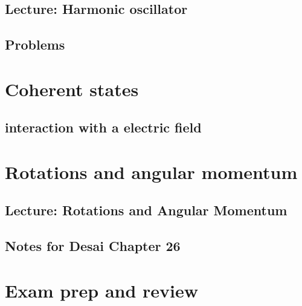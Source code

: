       \section{Lecture: Harmonic oscillator}
         
      \section{Problems}
         
         

   \chapter{Coherent states}
      \section{interaction with a electric field}
         

   \chapter{Rotations and angular momentum}
      \section{Lecture: Rotations and Angular Momentum}
         
      \section{Notes for Desai Chapter 26}
         

%      

   \chapter{Exam prep and review}
      
      
